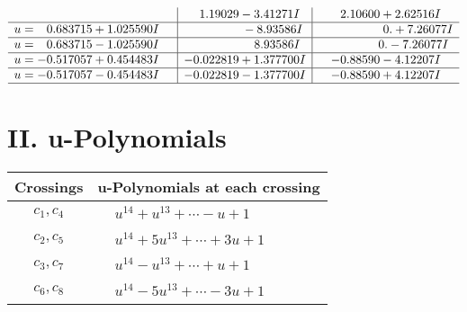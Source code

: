 \documentclass[1p]{elsarticle_modified}
\theoremstyle{definition}
\begin{document}
$$\begin{array}{c|c|c}
 & \phantom{-}1.19029 - 3.41271 I & \phantom{-}2.10600 + 2.62516 I \\ \hline\begin{aligned}
u &= \phantom{-}0.683715 + 1.025590 I\end{aligned}
 & \phantom{-0.000000 } -8.93586 I & \phantom{-0.000000 -}0. + 7.26077 I \\ \hline\begin{aligned}
u &= \phantom{-}0.683715 - 1.025590 I\end{aligned}
 & \phantom{-0.000000 -}8.93586 I & \phantom{-0.000000 } 0. - 7.26077 I \\ \hline\begin{aligned}
u &= -0.517057 + 0.454483 I\end{aligned}
 & -0.022819 + 1.377700 I & -0.88590 - 4.12207 I \\ \hline\begin{aligned}
u &= -0.517057 - 0.454483 I\end{aligned}
 & -0.022819 - 1.377700 I & -0.88590 + 4.12207 I\\
 \hline 
 \end{array}$$\newpage
\newpage\renewcommand{\arraystretch}{1}
\centering \section*{ II. u-Polynomials}
\begin{tabular}{m{50pt}|m{274pt}}
Crossings & \hspace{64pt}u-Polynomials at each crossing \\
\hline $$\begin{aligned}c_{1},c_{4}\end{aligned}$$&$\begin{aligned}
&u^{14}+u^{13}+\cdots- u+1
\end{aligned}$\\
\hline $$\begin{aligned}c_{2},c_{5}\end{aligned}$$&$\begin{aligned}
&u^{14}+5 u^{13}+\cdots+3 u+1
\end{aligned}$\\
\hline $$\begin{aligned}c_{3},c_{7}\end{aligned}$$&$\begin{aligned}
&u^{14}- u^{13}+\cdots+u+1
\end{aligned}$\\
\hline $$\begin{aligned}c_{6},c_{8}\end{aligned}$$&$\begin{aligned}
&u^{14}-5 u^{13}+\cdots-3 u+1
\end{aligned}$\\
\hline
\end{tabular}\newpage\renewcommand{\arraystretch}{1}
\end{document}
